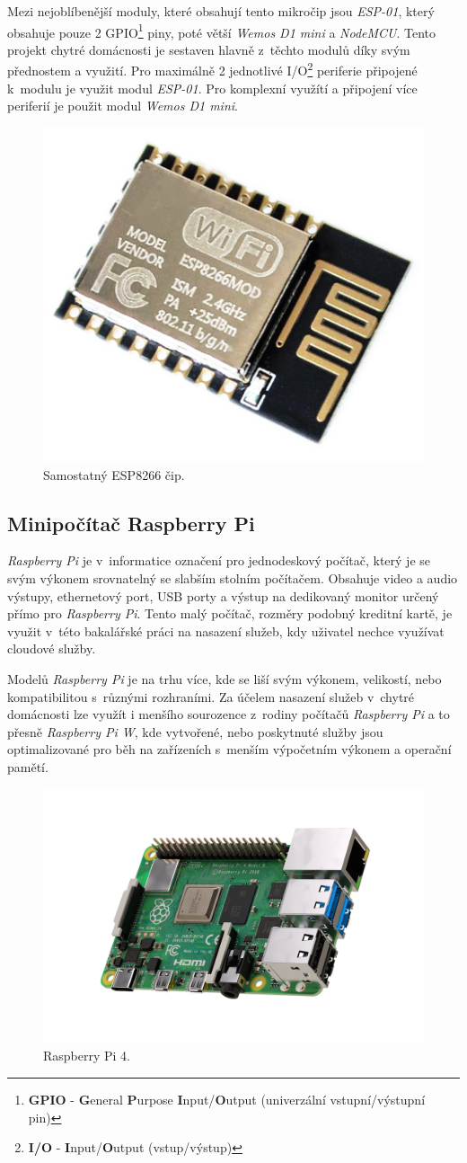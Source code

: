 Mezi nejoblíbenější moduly, které obsahují tento mikročip jsou \emph{ESP-01}, který obsahuje pouze 2 GPIO\footnote{\textbf{GPIO} - \textbf{G}eneral \textbf{P}urpose \textbf{I}nput/\textbf{O}utput (univerzální vstupní/výstupní pin)} piny, poté větší \emph{Wemos D1 mini} a \emph{NodeMCU}.
Tento projekt chytré domácnosti je sestaven hlavně z~těchto modulů díky svým přednostem a využití.
Pro maximálně 2 jednotlivé I/O\footnote{\textbf{I/O} - \textbf{I}nput/\textbf{O}utput (vstup/výstup)} periferie připojené k~modulu je využit modul \emph{ESP-01}.
Pro komplexní využítí a připojení více periferií je použit modul \emph{Wemos D1 mini}.

\begin{figure}[hbt]
  \centering
  \includegraphics[width=.2 \linewidth]{obrazky-figures/esp_standalone.png}
  \caption{Samostatný ESP8266 čip.~\cite{esp8266logo}}
  \label{figure:esp8266}
\end{figure}

\subsection*{Minipočítač Raspberry Pi}
\label{terminy:raspberry}

\emph{Raspberry Pi} je v~informatice označení pro jednodeskový počítač, který je se svým výkonem srovnatelný se slabším stolním počítačem.
Obsahuje video a audio výstupy,
ethernetový port, USB porty a výstup na dedikovaný monitor určený přímo pro \emph{Raspberry Pi}.
Tento malý počítač, rozměry podobný kreditní kartě, je využit v~této bakalářské práci na nasazení služeb, kdy uživatel nechce využívat cloudové služby.

Modelů \emph{Raspberry Pi} je na trhu více, kde se liší svým výkonem, velikostí, nebo kompatibilitou s~různými rozhraními.
Za účelem nasazení služeb v~chytré domácnosti lze využít i menšího sourozence z~rodiny počítačů \emph{Raspberry Pi} a to přesně \emph{Raspberry Pi W},
kde vytvořené, nebo poskytnuté služby jsou optimalizované pro běh na zařízeních s~menším výpočetním výkonem a operační pamětí.

\begin{figure}[ht]
  \centering
  \includegraphics[width=.5 \linewidth]{obrazky-figures/raspberry.png}
  \caption{Raspberry Pi 4.~\cite{raspberryLogo}}
\end{figure}

